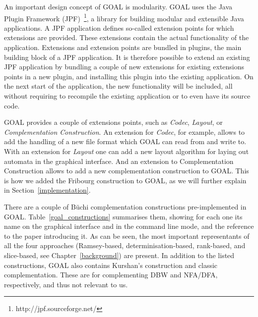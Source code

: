 An important design concept of GOAL is modularity. GOAL uses the Java Plugin Framework (JPF)~\footnote{http://jpf.sourceforge.net/}, a library for building modular and extensible Java applications. A JPF application defines so-called extension points for which extensions are provided. These extensions contain the actual functionality of the application. Extensions and extension points are bundled in plugins, the main building block of a JPF application. It is therefore possible to extend an existing JPF application by bundling a couple of new extensions for existing extensions points in a new plugin, and installing this plugin into the existing application. On the next start of the application, the new functionality will be included, all without requiring to recompile the existing application or to even have its source code.

GOAL provides a couple of extensions points, such as \textit{Codec}, \textit{Layout}, or \textit{Complementation Construction}. An extension for \textit{Codec}, for example, allows to add the handling of a new file format which GOAL can read from and write to. With an extension for \textit{Layout} one can add a new layout algorithm for laying out automata in the graphical interface. And an extension to \textsf{Complementation Construction} allows to add a new complementation construction to GOAL. This is how we added the Fribourg construction to GOAL, as we will further explain in Section~\ref{implementation}.

There are a couple of Büchi complementation constructions pre-implemented in GOAL. Table~\ref{goal_constructions} summarises them, showing for each one its name on the graphical interface and in the command line mode, and the reference to the paper introducing it. As can be seen, the most important representants of all the four approaches (Ramsey-based, determinisation-based, rank-based, and slice-based, see Chapter~\ref{background}) are present. In addition to the listed constructions, GOAL also contains Kurshan's construction and classic complementation. These are for complementing DBW and NFA/DFA, respectively, and thus not relevant to us.

